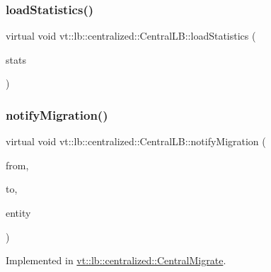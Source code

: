 \subsubsection{\texorpdfstring{load\+Statistics()}{loadStatistics()}}
{\footnotesize\ttfamily virtual void vt\+::lb\+::centralized\+::\+Central\+L\+B\+::load\+Statistics (\begin{DoxyParamCaption}\item[{\hyperlink{structvt_1_1lb_1_1centralized_1_1_central_l_b_aafbf9d4fbe90a3561fd812661c970b2d}{Load\+Stats\+Type} const \&}]{stats }\end{DoxyParamCaption})\hspace{0.3cm}{\ttfamily [pure virtual]}}

\mbox{\label{structvt_1_1lb_1_1centralized_1_1_central_l_b_af7a0204c9839ccf77a2fd724a2c9841c}} 
\subsubsection{\texorpdfstring{notify\+Migration()}{notifyMigration()}}
{\footnotesize\ttfamily virtual void vt\+::lb\+::centralized\+::\+Central\+L\+B\+::notify\+Migration (\begin{DoxyParamCaption}\item[{\hyperlink{namespacevt_a866da9d0efc19c0a1ce79e9e492f47e2}{Node\+Type} const \&}]{from,  }\item[{\hyperlink{namespacevt_a866da9d0efc19c0a1ce79e9e492f47e2}{Node\+Type} const \&}]{to,  }\item[{\hyperlink{namespacevt_a92ec26fb6644cd0ba7eb0ee70c96bee5}{L\+B\+Entity\+Type} const \&}]{entity }\end{DoxyParamCaption})\hspace{0.3cm}{\ttfamily [pure virtual]}}



Implemented in \hyperlink{structvt_1_1lb_1_1centralized_1_1_central_migrate_a0800d9661c46ca7870d6045be68ddcd7}{vt\+::lb\+::centralized\+::\+Central\+Migrate}.

\mbox{\label{structvt_1_1lb_1_1centralized_1_1_central_l_b_a478778a92cd3a05b9aa4b2b417cb4a4b}} 
